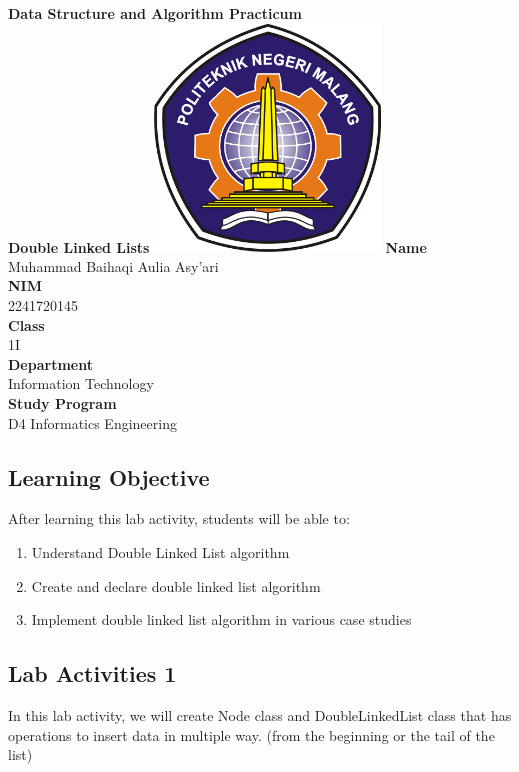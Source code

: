 \documentclass[12pt,titlepage]{article}
\newcommand{\vSubject}{Data Structure and Algorithm Practicum}
\newcommand{\vSubtitle}{Double Linked Lists}
\newcommand{\vName}{Muhammad Baihaqi Aulia Asy'ari}
\newcommand{\vNIM}{2241720145}
\newcommand{\vClass}{1I}
\newcommand{\vDepartment}{Information Technology}
\newcommand{\vStudyProgram}{D4 Informatics Engineering}
\begin{document}
\begin{titlepage}
    \centering
    \vfill
    {\bfseries\LARGE
        \vSubject\\
        \vskip0.25cm
        \vSubtitle
    }
    \vfill
    \includegraphics[width=6cm]{images/polinema-logo.png}
    \vfill
    {
        \textbf{Name}\\
        \vName\\
        \vskip0.5cm
        \textbf{NIM}\\
        \vNIM\\
        \vskip0.5cm
        \textbf{Class}\\
        \vClass\\
        \vskip0.5cm
        \textbf{Department}\\
        \vDepartment\\
        \vskip0.5cm
        \textbf{Study Program}\\
        \vStudyProgram
    }
\end{titlepage}

\newpage

\setcounter{section}{1}
\subsection{Learning Objective}
After learning this lab activity, students will be able to:
\begin{enumerate}
    \item Understand Double Linked List algorithm
    \item Create and declare double linked list algorithm
    \item Implement double linked list algorithm in various case studies
\end{enumerate}

\subsection{Lab Activities 1}
In this lab activity, we will create Node class and DoubleLinkedList class that has operations to insert data in multiple way. (from the beginning or the tail of the list)
\end{document}
